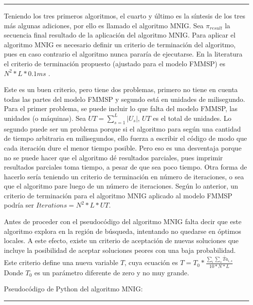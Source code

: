 \documentclass{article}
\begin{document}
\noindent\noindent
\rule{\linewidth}{0.4pt}

\vspace{\baselineskip}
Teniendo los tres primeros algoritmos, el cuarto y último es la síntesis de los
tres más algunas adiciones, por ello es llamado el algoritmo MNIG. Sea 
$\pi_{result}$ la secuencia final resultado de la aplicación del algoritmo MNIG.
Para aplicar el algoritmo MNIG es necesario definir un criterio de terminación
del algoritmo, pues en caso contrario el algoritmo nunca pararía de ejecutarse.
En la literatura el criterio de terminación propuesto (ajustado para el modelo
FMMSP) es $N^2*L*0.1ms$ \autocite{algMNIG}. 

\vspace{\baselineskip}
Este es un buen criterio, pero tiene
dos problemas, primero no tiene en cuenta todas las partes del modelo FMMSP y 
segundo está en unidades de milisegundo. Para el primer problema, se puede
incluir lo que falta del modelo FMMSP, las unidades (o máquinas). Sea 
$UT = \sum_{s = 1}^{L}|U_{s}|$, $UT$ es el total de unidades. Lo segundo puede
ser un problema porque si el algoritmo para según una cantidad de tiempo 
arbitraria en milisegundos, ello fuerza a escribir el código de modo que cada
iteración dure el menor tiempo posible. Pero eso es una desventaja porque no
se puede hacer que el algoritmo dé resultados parciales, pues imprimir resultados
parciales toma tiempo, a pesar de que sea poco tiempo. Otra forma de hacerlo sería
teniendo un criterio de terminación en número de iteraciones, o sea que el
algoritmo pare luego de un número de iteraciones. Según lo anterior, un criterio
de terminación para el algoritmo MNIG aplicado al modelo FMMSP podría ser
$Iterations = N^2*L*UT$.

\vspace{\baselineskip}
Antes de proceder con el pseudocódigo del algoritmo MNIG falta decir que este
algoritmo explora en la región de búsqueda, intentando no quedarse en óptimos
locales. A este efecto, existe un criterio de aceptación de nuevas soluciones
que incluye la posibilidad de aceptar soluciones peores con una baja probabilidad.
Este criterio define una nueva variable $T$, cuya ecuación es $T = 
T_{0}*\frac{\sum_{i}\sum_{s}\widetilde{Ta}_{i,s}}{10*N*L}$ Donde $T_{0}$ es un
parámetro diferente de zero y no muy grande. \autocite{algMNIG}

\vspace{\baselineskip}
Pseudocódigo de Python del algoritmo MNIG:

\noindent\noindent
\rule{\linewidth}{0.4pt}
\end{document}
